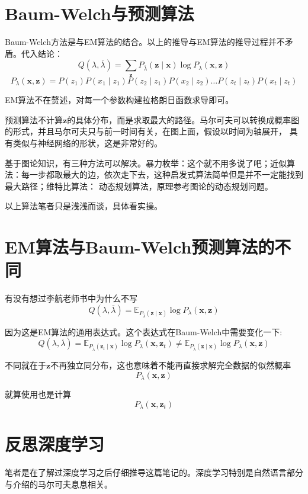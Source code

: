 \documentclass{article}
\begin{document}
    \section{Baum-Welch与预测算法}
        Baum-Welch方法是与EM算法的结合。以上的推导与EM算法的推导过程并不矛盾。代入结论：
        \[Q(\lambda,\overline{ \lambda})=\sum_{\boldsymbol{z}}P_{\overline{\lambda}}(\boldsymbol{z}\mid \boldsymbol{x})\log P_\lambda(\boldsymbol{x},\boldsymbol{z})\]
        \[P_\lambda(\boldsymbol{x},\boldsymbol{z})=P(z_1)P(x_1\mid z_1)P(z_2\mid z_1)P(x_2\mid z_2)\dots P(z_t\mid z_t)P(x_t\mid z_t)\]   
        
        EM算法不在赘述，对每一个参数构建拉格朗日函数求导即可。
        
        预测算法不计算$\boldsymbol{z}$的具体分布，而是求取最大的路径。马尔可夫可以转换成概率图的形式，并且马尔可夫只与前一时间有关，在图上面，假设以时间为轴展开，
        具有类似与神经网络的形状，这是非常好的。

        基于图论知识，有三种方法可以解决。暴力枚举：这个就不用多说了吧；近似算法：每一步都取最大的边，依次走下去，这种启发式算法简单但是并不一定能找到最大路径；维特比算法：
        动态规划算法，原理参考图论的动态规划问题。

        以上算法笔者只是浅浅而谈，具体看实操。

    \section{EM算法与Baum-Welch预测算法的不同}
        有没有想过李航老师书中为什么不写
        \[Q(\lambda,\overline{ \lambda})=\mathbb{E}_{P_{\overline{\lambda}}(\boldsymbol{z}\mid \boldsymbol{x})}\log P_\lambda(\boldsymbol{x},\boldsymbol{z})\]

        因为这是EM算法的通用表达式。这个表达式在Baum-Welch中需要变化一下:
        \[Q(\lambda,\overline{ \lambda})=\mathbb{E}_{P_{\overline{\lambda}}(\boldsymbol{z}_t\mid \boldsymbol{x})}\log P_\lambda(\boldsymbol{x},\boldsymbol{z}_t)\neq\mathbb{E}_{P_{\overline{\lambda}}(\boldsymbol{z}\mid \boldsymbol{x})}\log P_\lambda(\boldsymbol{x},\boldsymbol{z})\]

        不同就在于$\boldsymbol{z}$不再独立同分布，这也意味着不能再直接求解完全数据的似然概率
        \[P_\lambda(\boldsymbol{x},\boldsymbol{z})\]

        就算使用也是计算
        \[P_\lambda(\boldsymbol{x},\boldsymbol{z}_t)\]

    \section{反思深度学习}
        笔者是在了解过深度学习之后仔细推导这篇笔记的。深度学习特别是自然语言部分与介绍的马尔可夫息息相关。
        
\end{document}
